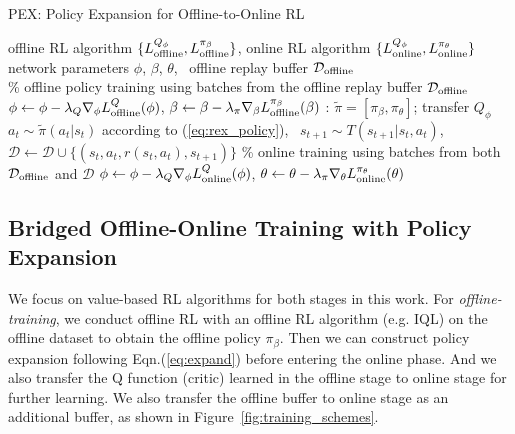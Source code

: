 \documentclass{article}
\begin{document}
\vspace{-0.05in}
\begin{algorithm}[h]
	\centering
	\caption{PEX: Policy Expansion for Offline-to-Online RL}
	\label{alg:algo}
			\begin{algorithmic}
				 offline RL algorithm $\{L^{Q_{\phi}}_{\rm offline}, L_{\rm offline}^{\pi_{\beta}}\}$, online RL algorithm $\{L^{Q_{\phi}}_{\rm online}, L_{\rm online}^{\pi_{\theta}}\}$\footnotemark
				 network parameters $\phi$, $\beta$, $\theta$, \,  offline replay buffer $\mathcal{D}_{\rm offline}$\\
				\STATE  \% offline policy training using batches from the offline replay buffer $\mathcal{D}_{\rm offline}$
				\STATE   $\phi \leftarrow \phi  - \lambda_Q \nabla_{\phi} L^{Q}_{\rm offline}(\phi)$, \quad $\beta \leftarrow \beta  - \lambda_{\pi} \nabla_{\beta} L_{\rm offline}^{\pi_{\beta}}(\beta)$
				\ENDWHILE
				:  $\tilde{\pi} = [\pi_{\beta}, \pi_{\theta}]$; transfer $Q_{\phi}$
						\STATE 	$a_t \sim \tilde{\pi}(a_t|s_t)$ according to (\ref{eq:rex_policy}), \, $s_{t+1} \sim T(s_{t+1}| s_t, a_t)$, \, $\mathcal{D} \leftarrow \mathcal{D}\cup \{(s_{t}, a_t, r(s_t, a_t), s_{t+1})\} $
					\ENDFOR
					\STATE  \% online  training using batches from both $\mathcal{D}_{\rm offline}$ and  $\mathcal{D}$
					\STATE   $\phi \leftarrow \phi  - \lambda_Q \nabla_{\phi} L^Q_{\rm online}(\phi)$, \quad $\theta \leftarrow \theta  - \lambda_{\pi} \nabla_{\theta} L_{\rm online}^{\pi_{\theta}}(\theta)$
					\ENDFOR
				\ENDWHILE
			\end{algorithmic}
\end{algorithm}
\vspace{-0.15in}



\vspace{-0.15in}
\subsection{Bridged Offline-Online Training with Policy Expansion}
\vspace{-0.1in}
We focus on value-based RL algorithms for both stages in this work.
For \emph{offline-training}, we conduct offline RL with an offline RL algorithm ({e.g.} IQL) on the offline dataset to obtain the offline policy $\pi_{\beta}$.
Then we can construct policy expansion following  Eqn.(\ref{eq:expand}) before entering the online phase.
And we also transfer the Q function (critic) learned in the offline stage to online stage for further learning.
We also transfer the offline buffer to online stage as an additional buffer, as shown in Figure~\ref{fig:training_schemes}.
\end{document}
